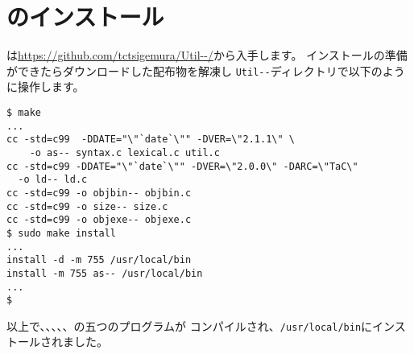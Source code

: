 % 
%
\chapter{\util のインストール}

\util は\url{https://github.com/tctsigemura/Util--/}から入手します。
インストールの準備ができたらダウンロードした配布物を解凍し
\verb/Util--/ディレクトリで以下のように操作します。

\begin{mylist}
\begin{verbatim}
$ make
...
cc -std=c99  -DDATE="\"`date`\"" -DVER=\"2.1.1\" \
	-o as-- syntax.c lexical.c util.c
cc -std=c99 -DDATE="\"`date`\"" -DVER=\"2.0.0\" -DARC=\"TaC\"
  -o ld-- ld.c
cc -std=c99 -o objbin-- objbin.c
cc -std=c99 -o size-- size.c
cc -std=c99 -o objexe-- objexe.c
$ sudo make install
...
install -d -m 755 /usr/local/bin
install -m 755 as-- /usr/local/bin
...
$
\end{verbatim}
\end{mylist}

以上で、\as 、\ld 、\objbin 、\objexe 、\size の五つのプログラムが
コンパイルされ、\verb;/usr/local/bin;にインストールされました。
